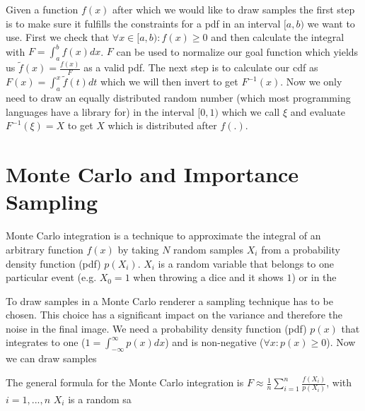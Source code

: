 Given a function $ f(x) $ after which we would like to draw samples the first step is to make sure it fulfills the constraints for a pdf in an interval $ [a, b) $ we want to use.
First we check that $ \forall x \in [a, b): f(x) \geq 0 $ and then calculate the integral with $ F = \int_{a}^b f(x) dx $.
$ F $ can be used to normalize our goal function which yields us $ \tilde{f}(x) = \frac{f(x)}{F} $ as a valid pdf.
The next step is to calculate our cdf as $ F(x) = \int_{a}^x \tilde{f}(t) dt $ which we will then invert to get $ F^{-1}(x) $.
Now we only need to draw an equally distributed random number (which most programming languages have a library for) in the interval $ [0, 1) $
which we call $ \xi $ and evaluate $ F^{-1}(\xi) = X $ to get $ X $ which is distributed after $ f(.) $.\cite{pris}


\section{Monte Carlo and Importance Sampling}
\label{sec:monte_carlo_importance_sammpling}

Monte Carlo integration is a technique to approximate the integral of an arbitrary function $ f(x) $
by taking $ N $ random samples $ X_i $ from a probability density function (pdf) $ p(X_i) $.
$ X_i $ is a random variable that belongs to one particular event (e.g. $ X_0 = 1 $ when throwing a dice and it shows $ 1 $) or in the

To draw samples in a Monte Carlo renderer a sampling technique has to be chosen.
This choice has a significant impact on the variance and therefore the noise in the final image.
We need a probability density function (pdf) $ p(x) $ that integrates to one ($ 1 = \int_{-\infty}^{\infty} p(x) dx $)
and is non-negative ($ \forall x: p(x) \geq 0 $).
Now we can draw samples


The general formula for the Monte Carlo integration is $ F \approx \frac{1}{n} \sum_{i = 1}^n \frac{f(X_i)}{p(X_i)} $, with $ i = 1,...,n $  $ X_i $ is a random sa



